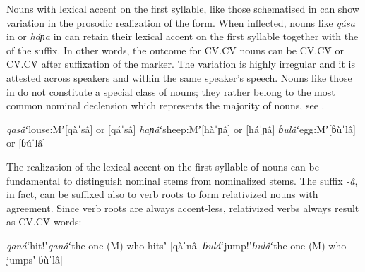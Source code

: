 \documentclass[output=paper]{LSP/langsci}
\begin{document}
Nouns with lexical accent on the first syllable, like those schematised in  can show variation in the prosodic realization of the  form. When inflected, nouns like \textit{qása} in  or \textit{háɲa} in  can retain their lexical accent on the first syllable together with the  of the  suffix. In other words, the outcome for CV́.CV nouns can be CV.CV̂ or CV́.CV̂ after suffixation of the   marker. The variation is highly irregular and it is attested across speakers and within the same speaker's speech. Nouns like those in  do not constitute a special class of nouns; they rather belong to the most common nominal declension which represents the majority of  nouns, see \citet[74]{Petrollino2016}. 
\begin{exe}
\ex \label{ex:Petrollino:irregular}\begin{xlist}
\ex \textit{qasâ}\hspace{16mm}ʻlouse:Mʼ\hspace{10mm}[qàˈsâ] or [qáˈsâ]
\ex \textit{haɲâ}\hspace{16mm}ʻsheep:Mʼ\hspace{9mm}[hàˈɲâ] or [háˈɲâ]
\ex \textit{ɓulâ}\hspace{17mm}ʻegg:Mʼ\hspace{13mm}[ɓùˈlâ] or [ɓúˈlâ]
\end{xlist}
\end{exe}

The realization of the lexical accent on the first syllable of  nouns can be fundamental to distinguish nominal stems from nominalized stems. The  suffix \textit{-â}, in fact, can be suffixed also to verb roots to form relativized nouns with  agreement. Since verb roots are always accent-less,  relativized verbs always result as CV.CV̂ words:
\begin{exe}
\ex \label{ex:Petrollino:relativized verbs} \begin{xlist}
\ex \textit{qaná}\hspace{15mm}ʻhit!ʼ\hspace{8mm}\textit{qanâ}\hspace{8mm}ʻthe one (M) who hitsʼ\hspace{5mm} [qàˈnâ]
\ex \textit{ɓulá}\hspace{16mm}ʻjump!ʼ\hspace{4mm}\textit{ɓulâ}\hspace{9mm}ʻthe one (M) who jumpsʼ\hspace{2mm}[ɓùˈlâ]
\end{xlist}
\end{exe}
\end{document}
